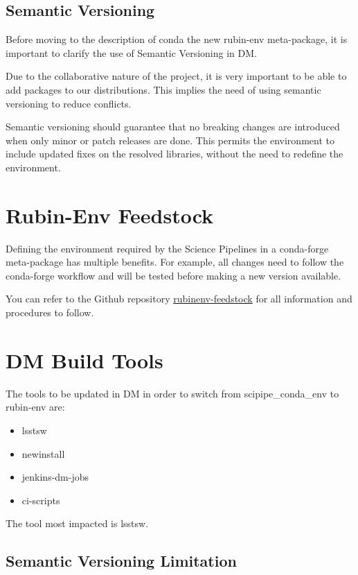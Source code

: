 \documentclass[DM,authoryear,toc]{lsstdoc}
\begin{document}
\subsection{Semantic Versioning} \label{sec:semantic}

Before moving to the description of conda the new rubin-env meta-package, it is important to clarify
the use of Semantic Versioning in DM.

Due to the collaborative nature of the project, it is very important to be able to add packages to our distributions.
This implies the need of using semantic versioning to reduce conflicts.

Semantic versioning should guarantee that no breaking changes are introduced when only minor or patch releases are done.
This permits the environment to include updated fixes on the resolved libraries, without the need to redefine the environment.


\section{Rubin-Env Feedstock} \label{sec:feedstock}

Defining the environment required by the Science Pipelines in a  conda-forge meta-package has multiple benefits.
For example, all changes need to follow the conda-forge workflow and will be tested before making a new version available.

You can refer to the Github repository \href{https://github.com/conda-forge/rubinenv-feedstock}{rubinenv-feedstock} 
for all information and procedures to follow.


\section{DM Build Tools} \label{sec:buildtools}

The tools to be updated in DM in order to switch from scipipe\_conda\_env to rubin-env are:

\begin{itemize}
\item lsstsw
\item newinstall
\item jenkins-dm-jobs
\item ci-scripts
\end{itemize}

The tool most impacted is lsstsw.


\subsection{Semantic Versioning Limitation} \label{sec:limitations}
\end{document}
